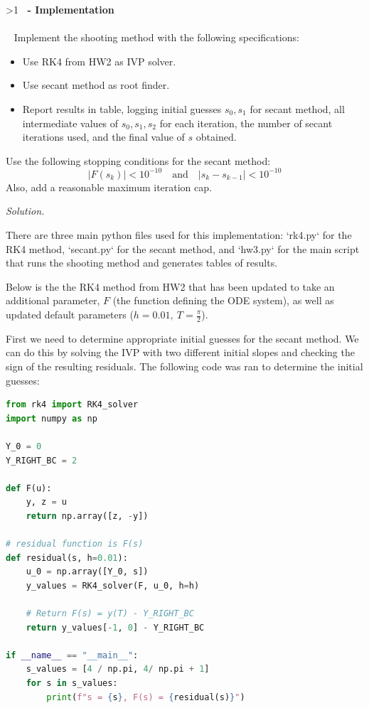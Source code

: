 \documentclass[12pt]{article}
\newcounter{question}
\newcounter{subquest}
\newcommand{\question}[1]{
    \stepcounter{question} 
    \ifnum\value{question}>1 \fi
    \vspace{.5em}
    \textbf{ \Large\thequestion \ - #1} \\
    \vspace{.5em} 
    \hrulefill \\
    \setcounter{subquest}{0}\ }
\newcommand{\solution}
    {\hrulefill \par\vspace{0.5em}\noindent\emph{Solution.}\ }
    {\par\vspace{1em}}
\begin{document}
\setcounter{page}{3}
\question{Implementation}
Implement the shooting method with the following specifications:
\begin{itemize}
    \item[(a)] Use RK4 from HW2 as IVP solver.
    \item[(b)] Use secant method as root finder.
    \item[(c)] Report results in table, logging initial guesses $s_0, s_1$ for secant method, all intermediate values of $s_0, s_1, s_2$ for each iteration, the number of secant iterations used, and the final value of $s$ obtained.  
\end{itemize}
Use the following stopping conditions for the secant method:
\[ |F(s_k)|<10^{-10} \quad \text{and} \quad |s_k - s_{k-1}| < 10^{-10} \]
Also, add a reasonable maximum iteration cap.

\solution

There are three main python files used for this implementation: `rk4.py` for the RK4 method, `secant.py` for the secant method, and `hw3.py` for the main script that runs the shooting method and generates tables of results.

Below is the the RK4 method from HW2 that has been updated to take an additional parameter, $F$ (the function defining the ODE system), as well as updated default parameters ($h=0.01, \ T = \frac{\pi}{2}$).



First we need to determine appropriate initial guesses for the secant method. We can do this by solving the IVP with two different initial slopes and checking the sign of the resulting residuals. The following code was ran to determine the initial guesses:

\begin{lstlisting}[language=Python, caption={Determining Initial Guesses for Secant Method (hw3.py)}]
from rk4 import RK4_solver
import numpy as np

Y_0 = 0
Y_RIGHT_BC = 2

def F(u):
    y, z = u
    return np.array([z, -y])

# residual function is F(s)
def residual(s, h=0.01):
    u_0 = np.array([Y_0, s])
    y_values = RK4_solver(F, u_0, h=h)

    # Return F(s) = y(T) - Y_RIGHT_BC
    return y_values[-1, 0] - Y_RIGHT_BC

if __name__ == "__main__":
    s_values = [4 / np.pi, 4/ np.pi + 1]  
    for s in s_values:
        print(f"s = {s}, F(s) = {residual(s)}")
\end{lstlisting}
\end{document}
